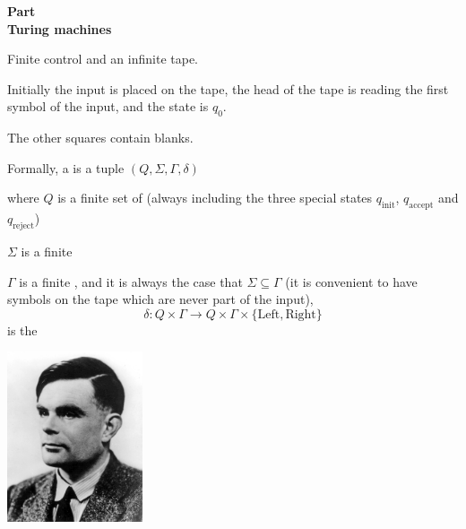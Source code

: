 
\newcommand{\mytitle}{Computational Foundations: Turing Machines}
\newcommand{\mychpnr}{9}


\begin{frame}
\begin{center}
\addtocounter{part}{1}
{\bf Part  \\ Turing machines}
\end{center}
\end{frame}

\begin{frame}
Finite control and an infinite tape.

Initially the input is placed on the tape, the head of the tape is
reading the first symbol of the input, and the state is $q_0$.

The other squares contain blanks.

Formally, a  is a tuple 
$(Q,\Sigma,\Gamma,\delta)$

where $Q$ is a finite set of  (always
including the three special states $q_{\text{init}}$,
$q_{\text{accept}}$ and
$q_{\text{reject}}$)

$\Sigma$ is a finite  

$\Gamma$ is a finite , and it is always the case that $\Sigma\subseteq\Gamma$ (it
is convenient to have symbols on the tape which are never part of the
input),
$$
\delta:Q\times\Gamma\rightarrow
Q\times\Gamma\times\{\text{Left},\text{Right}\}
$$ 
is the 
\end{frame}

\begin{frame}
\begin{minipage}{5cm}
\includegraphics[width=4cm]{figures/AlanTuring.jpg}
\end{minipage}
\begin{minipage}{5cm}
 \\
\end{minipage}
\end{frame}

